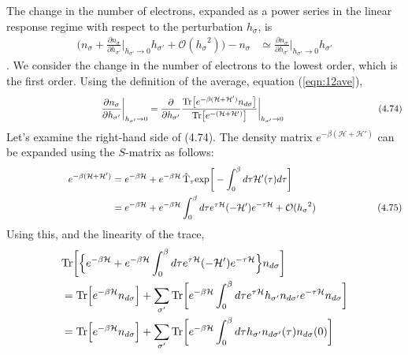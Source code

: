 \documentclass[a4j]{jarticle}
\begin{document}
The change in the number of electrons, expanded as a power series in the linear response regime with respect to the perturbation $h_{\sigma}$, is
\begin{align}
	\bigg(
	n_{\sigma}
	+
	\frac{\partial n_{\sigma}}{\partial h_{\sigma'}}
	\bigg|_{h_{\sigma'} \to 0}
	h_{\sigma'}
	+
	\mathcal{O}({h_{\sigma}}^{2})
	\bigg)
	-
	n_{\sigma}
	 & \simeq
	\frac{\partial n_{\sigma}}{\partial h_{\sigma'}}
	\bigg|_{h_{\sigma'} \to 0}
	h_{\sigma'}
\end{align}
.
We consider the change in the number of electrons to the lowest order, which is the first order.
Using the definition of the average, equation (\ref{eqn:12ave}),
\begin{align}
	\hspace{35.5mm}
	\frac{\partial n_{\sigma}}{\partial h_{\sigma'}}
	\bigg|_{h_{\sigma'} \to 0}
	=
	\frac{\partial}{\partial h_{\sigma'}}
	\frac{
		{\rm Tr} \big[ e^{- \beta (\mathcal{H}+\mathcal{H}') } n_{d \sigma} \big]
	}{
		{\rm Tr} \big[ e^{- (\mathcal{H}+\mathcal{H}') } \big]
	}
	\bigg|_{h_{\sigma'} \to 0}
	\nonumber
	\hspace{35.5mm}
	(4.74)
\end{align}
Let's examine the right-hand side of (4.74).
The density matrix $e^{- \beta (\mathcal{H}+\mathcal{H}')}$ can be expanded using the $S$-matrix as follows:
\begin{align}
	\hspace{22.4mm}
	e^{- \beta (\mathcal{H}+\mathcal{H}') }
	 & =
	e^{- \beta \mathcal{H} }
	+
	e^{- \beta \mathcal{H} }
	\ \!
	\hat{\rm T}_{\tau}
	{\rm exp}
	\bigg[
		-
		\int^{\beta}_{0}d \tau
		\mathcal{H}'(\tau)
		d \tau
		\bigg]
	\nonumber \\
	 & =
	e^{- \beta \mathcal{H} }
	+
	e^{- \beta \mathcal{H} }
	\int^{\beta}_{0}d \tau
	e^{\tau \mathcal{H}}
	( - \mathcal{H}' )
	e^{- \tau \mathcal{H}}
	+
	\mathcal{O}({h_{\sigma}}^{2})
	\nonumber
	\hspace{22.4mm}
	(4.75)
\end{align}
Using this, and the linearity of the trace,
\begin{align}
	&
	{\rm Tr}
	\bigg[
		\Big\{
		e^{- \beta \mathcal{H} }
		+
		e^{- \beta \mathcal{H} }
		\int^{\beta}_{0}d \tau
		e^{\tau \mathcal{H}}
		( - \mathcal{H}' )
		e^{- \tau \mathcal{H}}
		\Big\}
		n_{d \sigma}
		\bigg]
	\nonumber \\
	 & =
	{\rm Tr}
	\Big[
		e^{- \beta \mathcal{H} }
		n_{d \sigma}
		\Big]
	+
	\sum_{\sigma'}
	{\rm Tr}
	\bigg[
		e^{- \beta \mathcal{H} }
		\int^{\beta}_{0}d \tau
		e^{\tau \mathcal{H}}
		h_{\sigma'}
		n_{d \sigma'}
		e^{- \tau \mathcal{H}}
		n_{d \sigma}
		\bigg]
	\nonumber
	\\
	 & =
	{\rm Tr}
	\Big[
		e^{- \beta \mathcal{H} }
		n_{d \sigma}
		\Big]
	+
	\sum_{\sigma'}
	{\rm Tr}
	\bigg[
		e^{- \beta \mathcal{H} }
		\int^{\beta}_{0}d \tau
		h_{\sigma'}
		n_{d \sigma'}(\tau)
		n_{d \sigma}(0)
		\bigg]
\end{align}
\end{document}
